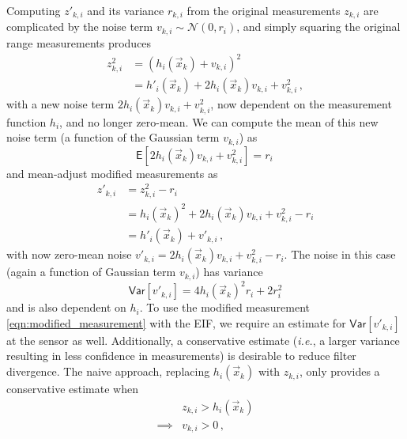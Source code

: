 \documentclass[10pt,letterpaper,oneside,twocolumn,journal]{IEEEtran}
\theoremstyle{definition}
\theoremstyle{definition}
\theoremstyle{remark}
\begin{document}
Computing $z'_{k,i}$ and its variance $r_{k,i}$ from the original measurements $z_{k,i}$ are complicated by the noise term $v_{k,i} \sim \mathcal{N}(0, r_i)$, and simply squaring the original range measurements produces
\begin{equation}
    \begin{split}
        z_{k,i}^2 &= (h_i(\vec{x}_k) + v_{k,i})^2 \\
        &= h'_i(\vec{x}_k) + 2h_i(\vec{x}_k)v_{k,i} + v_{k,i}^2\,,
    \end{split}
\end{equation}
with a new noise term $2h_i(\vec{x}_k)v_{k,i} + v_{k,i}^2$, now dependent on the measurement function $h_i$, and no longer zero-mean. We can compute the mean of this new noise term (a function of the Gaussian term $v_{k,i}$) as
\begin{equation}
    \mathsf{E}[2h_i(\vec{x}_k)v_{k,i} + v_{k,i}^2] = r_i\, \label{eqn:modified_noise_mean}
\end{equation}
and mean-adjust modified measurements as
\begin{equation}
    \begin{split}
        z'_{k,i} &= z_{k,i}^2 - r_i \\
        &= h_i(\vec{x}_k)^2 + 2h_i(\vec{x}_k)v_{k,i} + v_{k,i}^2 - r_i \\
        &= h'_i(\vec{x}_k) + v'_{k,i}\,,
    \end{split} \label{eqn:modified_measurement}
\end{equation}
with now zero-mean noise $v'_{k,i} = 2h_i(\vec{x}_k)v_{k,i} + v_{k,i}^2 - r_i$. The noise in this case (again a function of Gaussian term $v_{k,i}$) has variance 
\begin{equation}
    \mathsf{Var}[v'_{k,i}] = 4h_i(\vec{x}_k)^2r_i + 2r_i^2
\end{equation}
and is also dependent on $h_i$. To use the modified measurement \eqref{eqn:modified_measurement} with the EIF, we require an estimate for $\mathsf{Var}[v'_{k,i}]$ at the sensor as well. Additionally, a conservative estimate (\textit{i.e.}, a larger variance resulting in less confidence in measurements) is desirable to reduce filter divergence. The naive approach, replacing $h_i(\vec{x}_k)$ with $z_{k,i}$, only provides a conservative estimate when
\begin{equation}
    \begin{split}
        &z_{k,i} > h_i(\vec{x}_k) \\
        \implies &v_{k,i} > 0\,,
    \end{split}
\end{equation}
\end{document}
